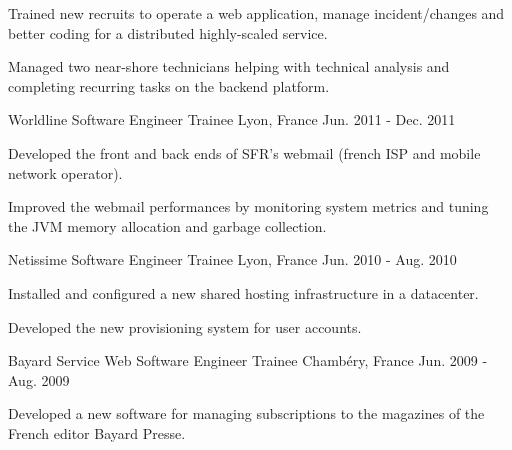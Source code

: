\begin{cventries}
{\begin{cvitems}
        \item {Trained new recruits to operate a web application, manage incident/changes and better coding for a distributed highly-scaled service.}
        \item {Managed two near-shore technicians helping with technical analysis and completing recurring tasks on the backend platform.}
      \end{cvitems} 
    }
  \cventry
    {Worldline}
    {Software Engineer Trainee}
    {Lyon, France}
    {Jun. 2011 - Dec. 2011}
    {
      \begin{cvitems}
        \item {Developed the front and back ends of SFR's webmail (french ISP and mobile network operator).}
        \item {Improved the webmail performances by monitoring system metrics and tuning the JVM memory allocation and garbage collection.}
      \end{cvitems}
    }
    \cventry
    {Netissime}
    {Software Engineer Trainee}
    {Lyon, France}
    {Jun. 2010 - Aug. 2010}
    {
      \begin{cvitems}
        \item {Installed and configured a new shared hosting infrastructure in a datacenter.}
        \item {Developed the new provisioning system for user accounts.}
      \end{cvitems}
    }
    \cventry
    {Bayard Service Web}
    {Software Engineer Trainee}
    {Chambéry, France}
    {Jun. 2009 - Aug. 2009}
    {
      \begin{cvitems}
        \item {Developed a new software for managing subscriptions to the magazines of the French editor Bayard Presse.}
      \end{cvitems}
    }
\end{cventries}
